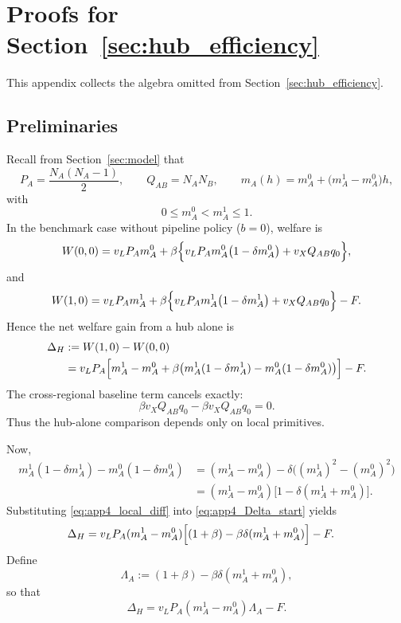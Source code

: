 \section{Proofs for Section~\ref{sec:hub_efficiency}}

This appendix collects the algebra omitted from Section~\ref{sec:hub_efficiency}.

\subsection{Preliminaries}

Recall from Section~\ref{sec:model} that
\[
P_A=\frac{N_A(N_A-1)}{2},
\qquad
Q_{AB}=N_A N_B,
\qquad
m_A(h)=m_A^0+\bigl(m_A^1-m_A^0\bigr)h,
\]
with
\[
0\le m_A^0<m_A^1\le 1.
\]
In the benchmark case without pipeline policy ($b=0$), welfare is
\begin{equation}
W(0,0)
=
v_L P_A m_A^0
+
\beta\Bigl\{
v_L P_A m_A^0\bigl(1-\delta m_A^0\bigr)
+
v_X Q_{AB}q_0
\Bigr\},
\label{eq:app4_W00}
\end{equation}
and
\begin{equation}
W(1,0)
=
v_L P_A m_A^1
+
\beta\Bigl\{
v_L P_A m_A^1\bigl(1-\delta m_A^1\bigr)
+
v_X Q_{AB}q_0
\Bigr\}
-F.
\label{eq:app4_W10}
\end{equation}
Hence the net welfare gain from a hub alone is
\begin{align}
\Delta_H
&:=W(1,0)-W(0,0)
\nonumber\\
&=
v_L P_A\Bigl[
m_A^1-m_A^0
+
\beta\bigl(
m_A^1(1-\delta m_A^1)-m_A^0(1-\delta m_A^0)
\bigr)
\Bigr]-F.
\label{eq:app4_Delta_start}
\end{align}
The cross-regional baseline term cancels exactly:
\[
\beta v_XQ_{AB}q_0-\beta v_XQ_{AB}q_0=0.
\]
Thus the hub-alone comparison depends only on local primitives.

Now,
\begin{align}
m_A^1(1-\delta m_A^1)-m_A^0(1-\delta m_A^0)
&=
(m_A^1-m_A^0)-\delta\bigl((m_A^1)^2-(m_A^0)^2\bigr)
\nonumber\\
&=
(m_A^1-m_A^0)\bigl[1-\delta(m_A^1+m_A^0)\bigr].
\label{eq:app4_local_diff}
\end{align}
Substituting \eqref{eq:app4_local_diff} into \eqref{eq:app4_Delta_start} yields
\begin{align}
\Delta_H
&=
v_L P_A(m_A^1-m_A^0)
\Bigl[(1+\beta)-\beta\delta(m_A^1+m_A^0)\Bigr]-F.
\label{eq:app4_Delta_factorized}
\end{align}
Define
\begin{equation}
\Lambda_A:=(1+\beta)-\beta\delta(m_A^1+m_A^0),
\label{eq:app4_Lambda}
\end{equation}
so that
\begin{equation}
\Delta_H=v_L P_A(m_A^1-m_A^0)\Lambda_A-F.
\label{eq:app4_Delta_Lambda}
\end{equation}

